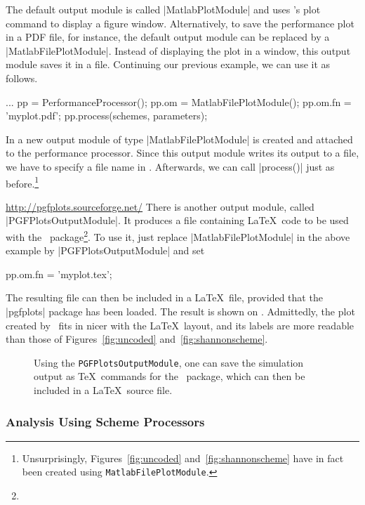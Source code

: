 The default output module is called |MatlabPlotModule| and uses \matlab's plot
command to display a figure window. Alternatively, to save the performance plot
in a PDF file, for instance, the default output module can be replaced by a
|MatlabFilePlotModule|. Instead of displaying the plot in a window, this output
module saves it in a file.  Continuing our previous example, we can use it as
follows.
\begin{Code}
  ...  %
  pp = PerformanceProcessor();
  pp.om = MatlabFilePlotModule();
  pp.om.fn = 'myplot.pdf';
  pp.process(schemes, parameters);  %
\end{Code}
In  a new output module of type |MatlabFilePlotModule| is
created and attached to the performance processor. Since this output module
writes its output to a file, we have to specify a file name in .
Afterwards, we can call |process()| just as before.\footnote{Unsurprisingly,
Figures~\ref{fig:uncoded} and~\ref{fig:shannonscheme} have in fact been created
using \Verb+MatlabFilePlotModule+.}

\urldef{\pgfplotsurl}\url{http://pgfplots.sourceforge.net/}
There is another output module, called |PGFPlotsOutputModule|. It produces a
file containing \LaTeX\ code to be used with the \pgfplots\
package\footnote{\pgfplotsurl}. To use it, just replace |MatlabFilePlotModule|
in the above example by |PGFPlotsOutputModule| and set \eg
\begin{Code}
  pp.om.fn = 'myplot.tex';
\end{Code}
The resulting file can then be included in a \LaTeX\ file, provided that the
|pgfplots| package has been loaded.  The result is shown on .
Admittedly, the plot created by \pgfplots\ fits in nicer with the \LaTeX\
layout, and its labels are more readable than those of Figures~\ref{fig:uncoded}
and~\ref{fig:shannonscheme}.

\begin{figure}
  \begin{center}
    
  \end{center}
  \caption{Using the \texttt{PGFPlotsOutputModule}, one can save the simulation
  output as \TeX\ commands for the \pgfplots\ package, which can then be
  included in a \LaTeX\ source file.}
  \label{fig:uncodedpgf}
\end{figure}


\subsubsection{Analysis Using Scheme Processors}

